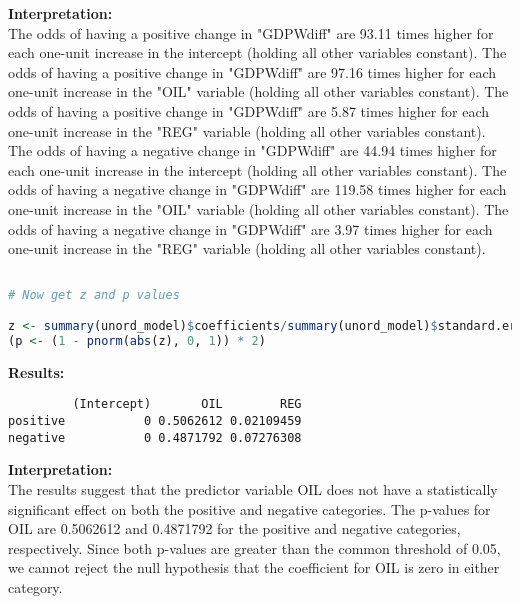 \documentclass[12pt,letterpaper]{article}
\begin{document}
\begin{enumerate}
\begin{verbatim}
	\end{verbatim}
	
	\noindent \textbf{Interpretation:} \\
	\noindent The odds of having a positive change in "GDPWdiff" are 93.11 times higher for each one-unit increase in the intercept (holding all other variables constant). The odds of having a positive change in "GDPWdiff" are 97.16 times higher for each one-unit increase in the "OIL" variable (holding all other variables constant). The odds of having a positive change in "GDPWdiff" are 5.87 times higher for each one-unit increase in the "REG" variable (holding all other variables constant).\\
	\noindent The odds of having a negative change in "GDPWdiff" are 44.94 times higher for each one-unit increase in the intercept (holding all other variables constant). The odds of having a negative change in "GDPWdiff" are 119.58 times higher for each one-unit increase in the "OIL" variable (holding all other variables constant). The odds of having a negative change in "GDPWdiff" are 3.97 times higher for each one-unit increase in the "REG" variable (holding all other variables constant).\\
	
	\newpage
	
	\begin{lstlisting}[language=R]
		
# Now get z and p values

z <- summary(unord_model)$coefficients/summary(unord_model)$standard.errors
(p <- (1 - pnorm(abs(z), 0, 1)) * 2)

	\end{lstlisting}

\noindent \textbf{Results:}
\begin{verbatim}
         (Intercept)       OIL        REG
positive           0 0.5062612 0.02109459
negative           0 0.4871792 0.07276308
\end{verbatim}

\noindent \textbf{Interpretation:}\\
\noindent The results suggest that the predictor variable OIL does not have a statistically significant effect on both the positive and negative categories. The p-values for OIL are 0.5062612 and 0.4871792 for the positive and negative categories, respectively. Since both p-values are greater than the common threshold of 0.05, we cannot reject the null hypothesis that the coefficient for OIL is zero in either category.\\


\end{enumerate}
\end{document}

